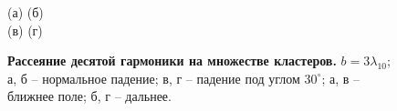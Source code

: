 \begin{figure}[H]
    (а)\:
    (б)\:
    \\(в)\:
    (г)\:
    \caption{\textbf{Рассеяние десятой гармоники на множестве кластеров.} $b = 3\lambda_{10}$; а, б -- нормальное падение; в, г -- падение под углом $30^{\circ}$; а, в -- ближнее поле; б, г -- дальнее.}
    \label{multi_sph_b3:image}
\end{figure}